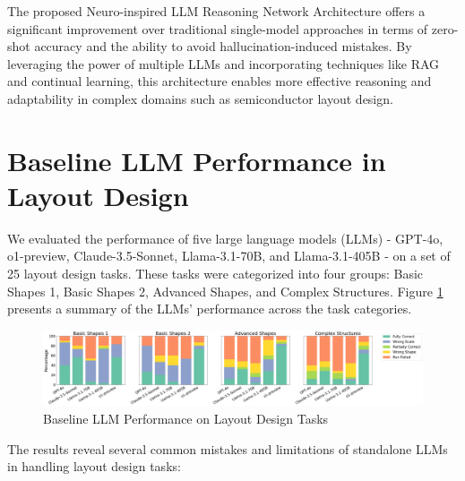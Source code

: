 \documentclass{article}
\begin{document}
The proposed Neuro-inspired LLM Reasoning Network Architecture offers a significant improvement over traditional single-model approaches in terms of zero-shot accuracy and the ability to avoid hallucination-induced mistakes. By leveraging the power of multiple LLMs and incorporating techniques like RAG and continual learning, this architecture enables more effective reasoning and adaptability in complex domains such as semiconductor layout design.

\section{Baseline LLM Performance in Layout Design}

We evaluated the performance of five large language models (LLMs) - GPT-4o, o1-preview, Claude-3.5-Sonnet, Llama-3.1-70B, and Llama-3.1-405B - on a set of 25 layout design tasks. These tasks were categorized into four groups: Basic Shapes 1, Basic Shapes 2, Advanced Shapes, and Complex Structures. Figure \ref{fig:baseline-llm-performance} presents a summary of the LLMs' performance across the task categories.

\begin{figure}[h]
  \centering
  \includegraphics[width=\textwidth]{baseline-llm-performance.png}
  \caption{Baseline LLM Performance on Layout Design Tasks}
  \label{fig:baseline-llm-performance}
\end{figure}

The results reveal several common mistakes and limitations of standalone LLMs in handling layout design tasks:
\end{document}
